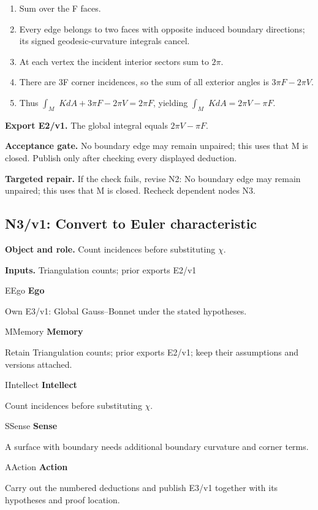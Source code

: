 \documentclass[preprint,12pt,aps,pra,showkeys,amsmath,amssymb,superscriptaddress,floatfix]{revtex4-2}
\theoremstyle{definition}
\theoremstyle{remark}
\newcommand{\mmfaculty}[3]{%
 \begin{mmfacultybox}{#1}{#2}
 {\sffamily\bfseries\color{MMBlue}#2}\par\smallskip #3
 \end{mmfacultybox}}
\newcommand{\field}[2]{\par\smallskip\noindent\textbf{#1.} #2\par}
\begin{document}
\begin{enumerate}[label=N2.\arabic*,leftmargin=3.4em]

\item Sum over the F faces.

\item Every edge belongs to two faces with opposite induced boundary
directions; its signed geodesic-curvature integrals cancel.

\item At each vertex the incident interior sectors sum to \(2\pi\).

\item There are 3F corner incidences, so the sum of all exterior angles is
\(3\pi F-2\pi V\).

\item Thus \(\int _M\) \(KdA+3\pi F-2\pi V=2\pi F\), yielding \(\int _M\)
\(KdA=2\pi V-\pi F\).

\end{enumerate}

\field{Export E2/v1}{The global integral equals \(2\pi V-\pi F\).}

\field{Acceptance gate}{No boundary edge may remain unpaired; this uses that M is closed.
Publish only after checking every displayed deduction.}

\field{Targeted repair}{If the check fails, revise N2: No boundary edge may remain unpaired;
this uses that M is closed. Recheck dependent nodes N3.}

\clearpage

\subsection{N3/v1: Convert to Euler characteristic}

\field{Object and role}{Count incidences before substituting \(\chi\).}

\field{Inputs}{Triangulation counts; prior exports E2/v1}

\mmfaculty{E}{Ego}{Own E3/v1: Global Gauss--Bonnet under the stated hypotheses.}

\mmfaculty{M}{Memory}{Retain Triangulation counts; prior exports E2/v1; keep their assumptions
and versions attached.}

\mmfaculty{I}{Intellect}{Count incidences before substituting \(\chi\).}

\mmfaculty{S}{Sense}{A surface with boundary needs additional boundary curvature and corner
terms.}

\mmfaculty{A}{Action}{Carry out the numbered deductions and publish E3/v1 together with its
hypotheses and proof location.}
\end{document}
